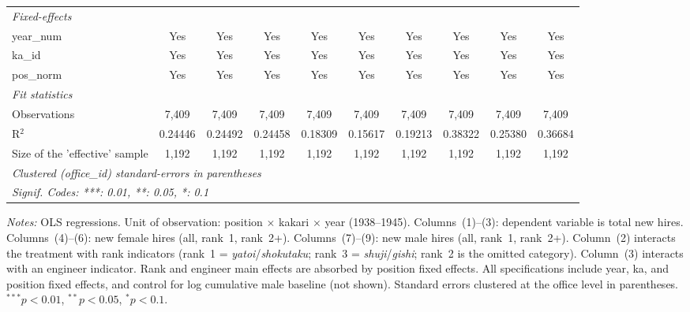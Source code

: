 \begin{table}[htbp]
\begin{threeparttable}
\begin{tabular}{lccccccccc}
   \midrule
   \emph{Fixed-effects}\\
   year\_num                      & Yes           & Yes             & Yes            & Yes      & Yes      & Yes           & Yes      & Yes           & Yes\\  
   ka\_id                         & Yes           & Yes             & Yes            & Yes      & Yes      & Yes           & Yes      & Yes           & Yes\\  
   pos\_norm                      & Yes           & Yes             & Yes            & Yes      & Yes      & Yes           & Yes      & Yes           & Yes\\  
   \midrule
   \emph{Fit statistics}\\
   Observations                   & 7,409         & 7,409           & 7,409          & 7,409    & 7,409    & 7,409         & 7,409    & 7,409         & 7,409\\  
   R$^2$                          & 0.24446       & 0.24492         & 0.24458        & 0.18309  & 0.15617  & 0.19213       & 0.38322  & 0.25380       & 0.36684\\  
   Size of the 'effective' sample & 1,192         & 1,192           & 1,192          & 1,192    & 1,192    & 1,192         & 1,192    & 1,192         & 1,192\\  
   \midrule \midrule
   \multicolumn{10}{l}{\emph{Clustered (office\_id) standard-errors in parentheses}}\\
   \multicolumn{10}{l}{\emph{Signif. Codes: ***: 0.01, **: 0.05, *: 0.1}}\\
\end{tabular}
\begin{tablenotes}[flushleft]
\footnotesize
\item \textit{Notes:} OLS regressions. Unit of observation: position $\times$ kakari $\times$ year (1938--1945). Columns~(1)--(3): dependent variable is total new hires. Columns~(4)--(6): new female hires (all, rank~1, rank~2+). Columns~(7)--(9): new male hires (all, rank~1, rank~2+). Column~(2) interacts the treatment with rank indicators (rank~1 = \emph{yatoi}/\emph{shokutaku}; rank~3 = \emph{shuji}/\emph{gishi}; rank~2 is the omitted category). Column~(3) interacts with an engineer indicator. Rank and engineer main effects are absorbed by position fixed effects. All specifications include year, ka, and position fixed effects, and control for log cumulative male baseline (not shown). Standard errors clustered at the office level in parentheses. $^{***}p<0.01$, $^{**}p<0.05$, $^{*}p<0.1$.
\end{tablenotes}
\end{threeparttable}
\end{table}
